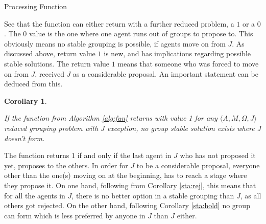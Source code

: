 \documentclass{elsarticle}
\newtheorem{mysta}{Corollary}
\begin{document}
\begin{algorithm}[H]
    \caption{Processing Function\label{alg:fun}}
\end{algorithm}

See that the function can either return with a further reduced problem, a $1$ or a $0$. The $0$ value is the one where one agent runs out of groups to propose to. This obviously means no stable grouping is possible, if agents move on from $J$. As discussed above, return value $1$ is new, and has implications regarding possible stable solutions. The return value $1$ means that someone who was forced to move on from $J$, received $J$ as a considerable proposal. An important statement can be deduced from this.

\begin{mysta}
\label{sta:ret1}

If the function from Algorithm \ref{alg:fun} returns with value 1 for any $\langle A,M,\Omega,J \rangle$ reduced grouping problem with $J$ exception, no group stable solution exists where $J$ doesn't form.

\end{mysta}

The function returns 1 if and only if the last agent in $J$ who has not proposed it yet, proposes to the others. In order for $J$ to be a considerable proposal, everyone other than the one(s) moving on at the beginning, has to reach a stage where they propose it. On one hand, following from Corollary \ref{sta:rej}, this means that for all the agents in $J$, there is no better option in a stable grouping than $J$, as all others got rejected. On the other hand, following Corollary \ref{sta:hold} no group can form which is less preferred by anyone in $J$ than $J$ either.
\end{document}

